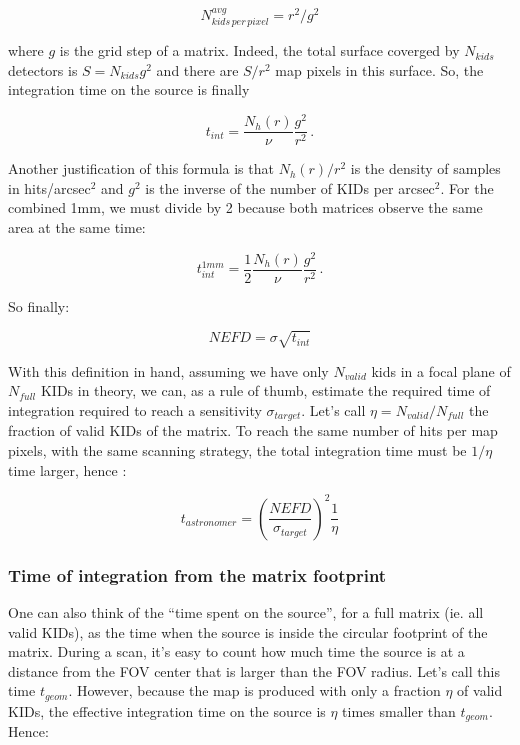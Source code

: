 \begin{equation}
N^{avg}_{kids\,per\,pixel} = r^2/g^2
\end{equation}

where $g$ is the grid step of a matrix. Indeed, the total surface coverged by
$N_{kids}$ detectors is $S = N_{kids}g^2$ and there are $S/r^2$ map pixels in
this surface. So, the integration time on the source is finally

\begin{equation}
t_{int} = \frac{N_h(r)}{\nu}\frac{g^2}{r^2}\,.
\label{eq:t_int}
\end{equation}

Another justification of this formula is that $N_h(r)/r^2$ is the density of
samples in hits/arcsec$^2$ and $g^2$ is the inverse of the number of KIDs per
arcsec$^2$. For the combined 1mm, we must divide by 2 because both matrices
observe the same area at the same time:

\begin{equation}
t^{1mm}_{int} = \frac{1}{2}\frac{N_h(r)}{\nu}\frac{g^2}{r^2}\,.
\label{eq:t_int_1mm}
\end{equation}

So finally:

\begin{equation}
NEFD = \sigma \sqrt{t_{int}}
\label{eq:nefd_t_int}
\end{equation}

With this definition in hand, assuming we have only $N_{valid}$ kids in a focal
plane of $N_{full}$ KIDs in theory, we can, as a rule of thumb, estimate
the required time of integration required to reach a sensitivity
$\sigma_{target}$. Let's call $\eta = N_{valid}/N_{full}$ the fraction of valid
KIDs of the matrix. To reach the same number of hits per map pixels, with the
same scanning strategy, the total integration time must be $1/\eta$ time larger,
hence : 

\begin{equation}
t_{astronomer} = \left(\frac{NEFD}{\sigma_{target}}\right)^2\frac{1}{\eta}
\label{eq:t_astro}
\end{equation}

\subsubsection{Time of integration from the matrix footprint}

One can also think of the ``time spent on the source'', for a full matrix
(ie. all valid KIDs), as the time when the source is inside the circular
footprint of the matrix. During a scan, it's easy to count how much time the
source is at a distance from the FOV center that is larger than the FOV
radius. Let's call this time $t_{geom}$. However, because the map is produced
with only a fraction $\eta$ of valid KIDs, the effective integration time on the
source is $\eta$ times smaller than $t_{geom}$. Hence:

